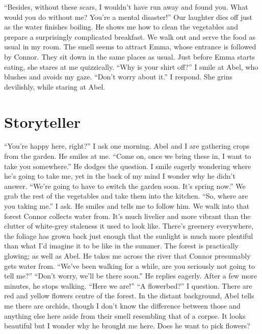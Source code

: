 \documentclass[openany, 12pt]{book}
\newcommand\tab[1][1cm]{\hspace*{#1}}
\begin{document}
\newline
\tab
``Besides, without these scars, I wouldn’t have run away and found you. What would you do without me? You’re a mental disaster!''
\newline
\tab
Our laughter dies off just as the water finishes boiling. He shows me how to clean the vegetables and prepare a surprisingly complicated breakfast. We walk out and serve the food as usual in my room. The smell seems to attract Emma, whose entrance is followed by Connor. They sit down in the same places as usual. Just before Emma starts eating, she stares at me quizzically. ``Why is your shirt off?'' I smile at Abel, who blushes and avoids my gaze.
\newline
\tab
``Don’t worry about it.'' I respond. She grins devilishly, while staring at Abel.
\chapter{Storyteller}
\tab
``You’re happy here, right?'' I ask one morning. Abel and I are gathering crops from the garden.
\newline
\tab
He smiles at me. ``Come on, once we bring these in, I want to take you somewhere.'' He dodges the question. I smile eagerly wondering where he’s going to take me, yet in the back of my mind I wonder why he didn’t answer. ``We’re going to have to switch the garden soon. It’s spring now.'' We grab the rest of the vegetables and take them into the kitchen.
\newline
\tab
``So, where are you taking me.'' I ask. He smiles and tells me to follow him. We walk into that forest Connor collects water from. It’s much livelier and more vibrant than the clutter of white-grey staleness it used to look like. There’s greenery everywhere, the foliage has grown back just enough that the sunlight is much more plentiful than what I’d imagine it to be like in the summer. The forest is practically glowing; as well as Abel. He takes me across the river that Connor presumably gets water from. ``We’ve been walking for a while, are you seriously not going to tell me?''
\newline
\tab
``Don’t worry, we’ll be there soon.'' He replies eagerly. After a few more minutes, he stops walking. ``Here we are!''
\newline
\tab
``A flowerbed?'' I question. There are red and yellow flowers centre of the forest. In the distant background, Abel tells me there are orchids, though I don’t know the difference between those and anything else here aside from their smell resembling that of a corpse. It looks beautiful but I wonder why he brought me here. Does he want to pick flowers?
\end{document}
